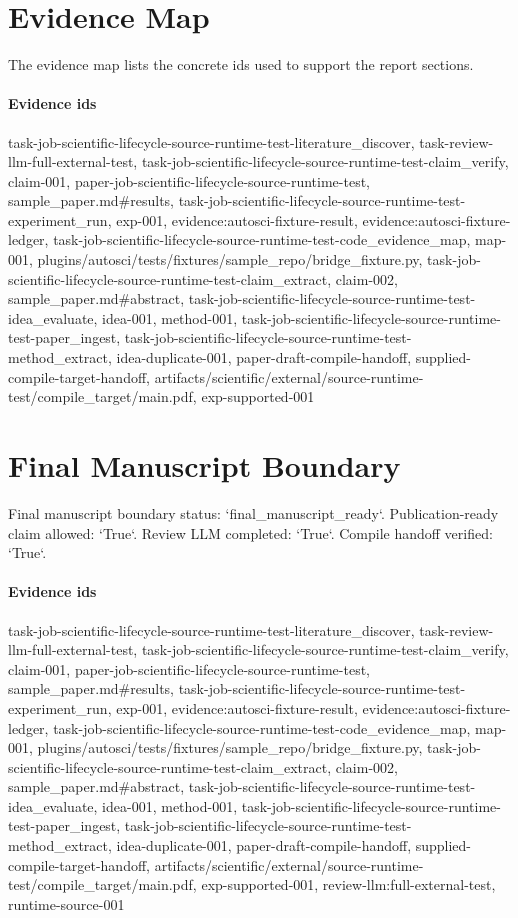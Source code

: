 \documentclass{article}
\begin{document}
\section{Evidence Map}
The evidence map lists the concrete ids used to support the report sections.

\paragraph{Evidence ids} task-job-scientific-lifecycle-source-runtime-test-literature\_discover, task-review-llm-full-external-test, task-job-scientific-lifecycle-source-runtime-test-claim\_verify, claim-001, paper-job-scientific-lifecycle-source-runtime-test, sample\_paper.md\#results, task-job-scientific-lifecycle-source-runtime-test-experiment\_run, exp-001, evidence:autosci-fixture-result, evidence:autosci-fixture-ledger, task-job-scientific-lifecycle-source-runtime-test-code\_evidence\_map, map-001, plugins/autosci/tests/fixtures/sample\_repo/bridge\_fixture.py, task-job-scientific-lifecycle-source-runtime-test-claim\_extract, claim-002, sample\_paper.md\#abstract, task-job-scientific-lifecycle-source-runtime-test-idea\_evaluate, idea-001, method-001, task-job-scientific-lifecycle-source-runtime-test-paper\_ingest, task-job-scientific-lifecycle-source-runtime-test-method\_extract, idea-duplicate-001, paper-draft-compile-handoff, supplied-compile-target-handoff, artifacts/scientific/external/source-runtime-test/compile\_target/main.pdf, exp-supported-001

\section{Final Manuscript Boundary}
Final manuscript boundary status: `final\_manuscript\_ready`. Publication-ready claim allowed: `True`. Review LLM completed: `True`. Compile handoff verified: `True`.

\paragraph{Evidence ids} task-job-scientific-lifecycle-source-runtime-test-literature\_discover, task-review-llm-full-external-test, task-job-scientific-lifecycle-source-runtime-test-claim\_verify, claim-001, paper-job-scientific-lifecycle-source-runtime-test, sample\_paper.md\#results, task-job-scientific-lifecycle-source-runtime-test-experiment\_run, exp-001, evidence:autosci-fixture-result, evidence:autosci-fixture-ledger, task-job-scientific-lifecycle-source-runtime-test-code\_evidence\_map, map-001, plugins/autosci/tests/fixtures/sample\_repo/bridge\_fixture.py, task-job-scientific-lifecycle-source-runtime-test-claim\_extract, claim-002, sample\_paper.md\#abstract, task-job-scientific-lifecycle-source-runtime-test-idea\_evaluate, idea-001, method-001, task-job-scientific-lifecycle-source-runtime-test-paper\_ingest, task-job-scientific-lifecycle-source-runtime-test-method\_extract, idea-duplicate-001, paper-draft-compile-handoff, supplied-compile-target-handoff, artifacts/scientific/external/source-runtime-test/compile\_target/main.pdf, exp-supported-001, review-llm:full-external-test, runtime-source-001
\end{document}
